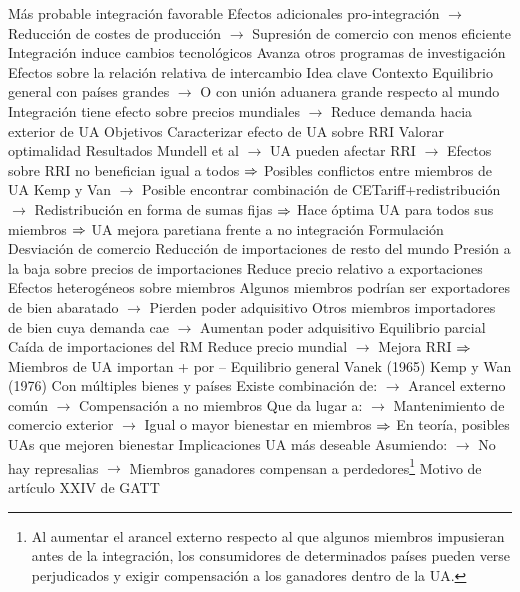 \documentclass{nuevotema}
\begin{document}
\begin{esquemal}
				\4 Más probable integración favorable
				\4[] Efectos adicionales pro-integración
				\4[] $\to$ Reducción de costes de producción
				\4[] $\to$ Supresión de comercio con menos eficiente
				\4 Integración induce cambios tecnológicos
				\4[] Avanza otros programas de investigación
		\2 Efectos sobre la relación relativa de intercambio
			\3 Idea clave
				\4 Contexto
				\4[] Equilibrio general con países grandes
				\4[] $\to$ O con unión aduanera grande respecto al mundo
				\4[] Integración tiene efecto sobre precios mundiales
				\4[] $\to$ Reduce demanda hacia exterior de UA
				\4 Objetivos
				\4[] Caracterizar efecto de UA sobre RRI
				\4[] Valorar optimalidad
				\4 Resultados
				\4[] Mundell et al
				\4[] $\to$ UA pueden afectar RRI
				\4[] $\to$ Efectos sobre RRI no benefician igual a todos
				\4[] $\Rightarrow$ Posibles conflictos entre miembros de UA
				\4[] Kemp y Van
				\4[] $\to$ Posible encontrar combinación de CETariff+redistribución
				\4[] $\to$ Redistribución en forma de sumas fijas
				\4[] $\Rightarrow$ Hace óptima UA para todos sus miembros
				\4[] $\Rightarrow$ UA mejora paretiana frente a no integración
			\3 Formulación
				\4 Desviación de comercio
				\4[] Reducción de importaciones de resto del mundo
				\4 Presión a la baja sobre precios de importaciones
				\4[] Reduce precio relativo a exportaciones
				\4 Efectos heterogéneos sobre miembros
				\4[] Algunos miembros podrían ser exportadores de bien abaratado
				\4[] $\to$ Pierden poder adquisitivo
				\4[] Otros miembros importadores de bien cuya demanda cae
				\4[] $\to$ Aumentan poder adquisitivo
				\4 Equilibrio parcial
				\4[] Caída de importaciones del RM
				\4[] Reduce precio mundial
				\4[] $\to$ Mejora RRI
				\4[] $\Rightarrow$ Miembros de UA importan + por --
				\4 Equilibrio general
				\4[] Vanek (1965)
				\4[] Kemp y Wan (1976)
				\4[] Con múltiples bienes y países
				\4[] Existe combinación de:
				\4[] $\to$ Arancel externo común
				\4[] $\to$ Compensación a no miembros
				\4[] Que da lugar a:
				\4[] $\to$ Mantenimiento de comercio exterior
				\4[] $\to$ Igual o mayor bienestar en miembros
				\4[] $\Rightarrow$ En teoría, posibles UAs que mejoren bienestar
			\3 Implicaciones
				\4 UA más deseable
				\4[] Asumiendo:
				\4[] $\to$ No hay represalias
				\4[] $\to$ Miembros ganadores compensan a perdedores\footnote{Al aumentar el arancel externo respecto al que algunos miembros impusieran antes de la integración, los consumidores de determinados países pueden verse perjudicados y exigir compensación a los ganadores dentro de la UA.}
				\4 Motivo de artículo XXIV de GATT

\end{esquemal}
\end{document}
